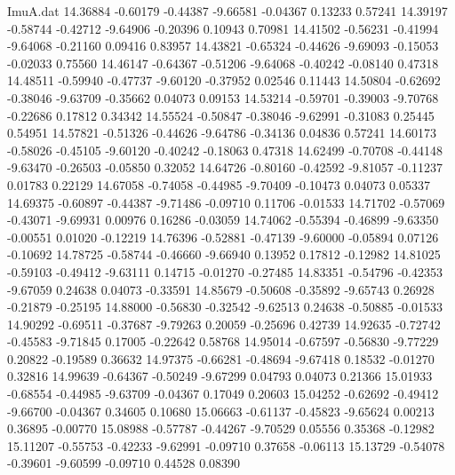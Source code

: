 \begin{filecontents}{ImuA.dat}
  14.36884   -0.60179   -0.44387   -9.66581   -0.04367    0.13233    0.57241
  14.39197   -0.58744   -0.42712   -9.64906   -0.20396    0.10943    0.70981
  14.41502   -0.56231   -0.41994   -9.64068   -0.21160    0.09416    0.83957
  14.43821   -0.65324   -0.44626   -9.69093   -0.15053   -0.02033    0.75560
  14.46147   -0.64367   -0.51206   -9.64068   -0.40242   -0.08140    0.47318
  14.48511   -0.59940   -0.47737   -9.60120   -0.37952    0.02546    0.11443
  14.50804   -0.62692   -0.38046   -9.63709   -0.35662    0.04073    0.09153
  14.53214   -0.59701   -0.39003   -9.70768   -0.22686    0.17812    0.34342
  14.55524   -0.50847   -0.38046   -9.62991   -0.31083    0.25445    0.54951
  14.57821   -0.51326   -0.44626   -9.64786   -0.34136    0.04836    0.57241
  14.60173   -0.58026   -0.45105   -9.60120   -0.40242   -0.18063    0.47318
  14.62499   -0.70708   -0.44148   -9.63470   -0.26503   -0.05850    0.32052
  14.64726   -0.80160   -0.42592   -9.81057   -0.11237    0.01783    0.22129
  14.67058   -0.74058   -0.44985   -9.70409   -0.10473    0.04073    0.05337
  14.69375   -0.60897   -0.44387   -9.71486   -0.09710    0.11706   -0.01533
  14.71702   -0.57069   -0.43071   -9.69931    0.00976    0.16286   -0.03059
  14.74062   -0.55394   -0.46899   -9.63350   -0.00551    0.01020   -0.12219
  14.76396   -0.52881   -0.47139   -9.60000   -0.05894    0.07126   -0.10692
  14.78725   -0.58744   -0.46660   -9.66940    0.13952    0.17812   -0.12982
  14.81025   -0.59103   -0.49412   -9.63111    0.14715   -0.01270   -0.27485
  14.83351   -0.54796   -0.42353   -9.67059    0.24638    0.04073   -0.33591
  14.85679   -0.50608   -0.35892   -9.65743    0.26928   -0.21879   -0.25195
  14.88000   -0.56830   -0.32542   -9.62513    0.24638   -0.50885   -0.01533
  14.90292   -0.69511   -0.37687   -9.79263    0.20059   -0.25696    0.42739
  14.92635   -0.72742   -0.45583   -9.71845    0.17005   -0.22642    0.58768
  14.95014   -0.67597   -0.56830   -9.77229    0.20822   -0.19589    0.36632
  14.97375   -0.66281   -0.48694   -9.67418    0.18532   -0.01270    0.32816
  14.99639   -0.64367   -0.50249   -9.67299    0.04793    0.04073    0.21366
  15.01933   -0.68554   -0.44985   -9.63709   -0.04367    0.17049    0.20603
  15.04252   -0.62692   -0.49412   -9.66700   -0.04367    0.34605    0.10680
  15.06663   -0.61137   -0.45823   -9.65624    0.00213    0.36895   -0.00770
  15.08988   -0.57787   -0.44267   -9.70529    0.05556    0.35368   -0.12982
  15.11207   -0.55753   -0.42233   -9.62991   -0.09710    0.37658   -0.06113
  15.13729   -0.54078   -0.39601   -9.60599   -0.09710    0.44528    0.08390

\end{filecontents}
